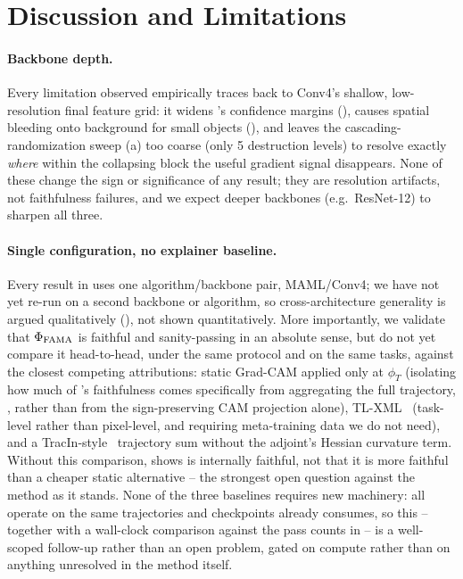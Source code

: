 \section{Discussion and Limitations}
\label{sec:limitations}

\paragraph{Backbone depth.} Every limitation observed empirically traces back to Conv4's shallow, low-resolution final feature grid: it widens \biadt's confidence margins (), causes spatial bleeding onto background for small objects (), and leaves the cascading-randomization sweep (a) too coarse (only 5 destruction levels) to resolve exactly \emph{where} within the collapsing block the useful gradient signal disappears. None of these change the sign or significance of any result; they are resolution artifacts, not faithfulness failures, and we expect deeper backbones (e.g.\ ResNet-12) to sharpen all three.

\paragraph{Single configuration, no explainer baseline.} Every result in  uses one algorithm/backbone pair, MAML/Conv4; we have not yet re-run  on a second backbone or algorithm, so cross-architecture generality is argued qualitatively (), not shown quantitatively. More importantly, we validate that $\Phi_{\mathrm{FAMA}}$ is faithful and sanity-passing in an absolute sense, but do not yet compare it head-to-head, under the same \biadt protocol and on the same tasks, against the closest competing attributions: static Grad-CAM applied only at $\phi_T$ (isolating how much of \fama's faithfulness comes specifically from aggregating the full trajectory, , rather than from the sign-preserving CAM projection alone), TL-XML~\cite{mitsuka2025tlxml} (task-level rather than pixel-level, and requiring meta-training data we do not need), and a TracIn-style~\cite{pruthi2020estimating} trajectory sum without the adjoint's Hessian curvature term. Without this comparison,  shows \fama is internally faithful, not that it is more faithful than a cheaper static alternative -- the strongest open question against the method as it stands. None of the three baselines requires new machinery: all operate on the same trajectories and checkpoints \fama already consumes, so this -- together with a wall-clock comparison against the pass counts in  -- is a well-scoped follow-up rather than an open problem, gated on compute rather than on anything unresolved in the method itself.

